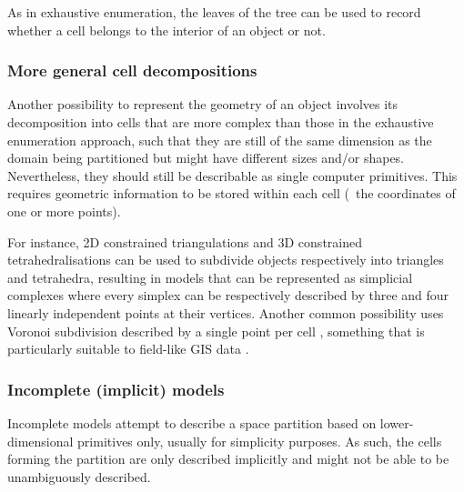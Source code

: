 As in exhaustive enumeration, the leaves of the tree can be used to record whether a cell belongs to the interior of an object or not.

\subsubsection{More general cell decompositions}

Another possibility to represent the geometry of an object involves its decomposition into cells that are more complex than those in the exhaustive enumeration approach, such that they are still of the same dimension as the domain being partitioned but might have different sizes and/or shapes.
Nevertheless, they should still be describable as single computer primitives.
This requires geometric information to be stored within each cell (\eg\ the coordinates of one or more points).

For instance, 2D constrained triangulations \citep{Chew89,Shewchuk96} and 3D constrained tetrahedralisations \citep{Si05} can be used to subdivide objects respectively into triangles and tetrahedra, resulting in models that can be represented as simplicial complexes where every simplex can be respectively described by three and four linearly independent points at their vertices.
Another common possibility uses Voronoi subdivision described by a single point per cell \citep{Voronoi08}, something that is particularly suitable to field-like GIS data \citep{Ledoux06}.

\subsubsection{Incomplete (implicit) models}

Incomplete models attempt to describe a space partition based on lower-dimensional primitives only, usually for simplicity purposes.
As such, the cells forming the partition are only described implicitly and might not be able to be unambiguously described.

